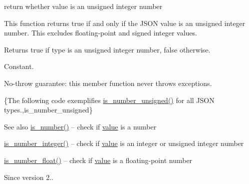 return whether value is an unsigned integer number 

This function returns true if and only if the J\+S\+ON value is an unsigned integer number. This excludes floating-\/point and signed integer values.

\begin{DoxyReturn}{Returns}
{\ttfamily true} if type is an unsigned integer number, {\ttfamily false} otherwise.
\end{DoxyReturn}
Constant.

No-\/throw guarantee\+: this member function never throws exceptions.

\{The following code exemplifies {\ttfamily \hyperlink{classnlohmann_1_1basic__json_a5493f2ed1e07b0ece428bd5a47e2fb95}{is\+\_\+number\+\_\+unsigned()}} for all J\+S\+ON types.,is\+\_\+number\+\_\+unsigned\}

\begin{DoxySeeAlso}{See also}
\hyperlink{classnlohmann_1_1basic__json_abd47ac8eba63833152795280f75b5851}{is\+\_\+number()} -- check if \hyperlink{classnlohmann_1_1basic__json_ac9e014095170d72c4c57e3daf8efc059}{value} is a number 

\hyperlink{classnlohmann_1_1basic__json_ac4b4acf2c0ad075c0dc125a65c102362}{is\+\_\+number\+\_\+integer()} -- check if \hyperlink{classnlohmann_1_1basic__json_ac9e014095170d72c4c57e3daf8efc059}{value} is an integer or unsigned integer number 

\hyperlink{classnlohmann_1_1basic__json_a116cdb9300b56519fc9cf756609296cb}{is\+\_\+number\+\_\+float()} -- check if \hyperlink{classnlohmann_1_1basic__json_ac9e014095170d72c4c57e3daf8efc059}{value} is a floating-\/point number
\end{DoxySeeAlso}
\begin{DoxySince}{Since}
version 2.. 
\end{DoxySince}
